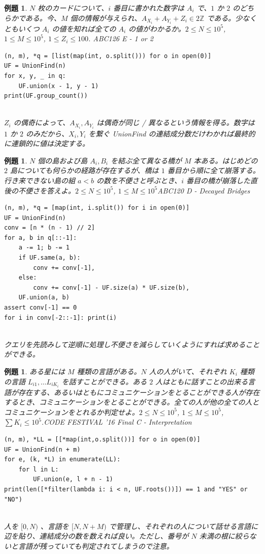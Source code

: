 \documentclass[12pt, a4j]{ltjsarticle}
\newtheorem{exm}[thm]{例題}
\newcommand*{\ZZ}{\mathbb{Z}}
\newcommand*{\SS}{\vspace{1cm}}
\begin{document}
\SS

\begin{exm} $N$ 枚のカードについて、$i$ 番目に書かれた数字は $A_i$ で、$1$ か $2$ のどちらかである。今、$M$ 個の情報が与えられ、$A_{X_i}+A_{Y_i}+Z_i \in 2\ZZ$ である。少なくともいくつ $A_i$ の値を知れば全ての $A_i$ の値がわかるか。$2\le N\le 10^5$, $1\le M\le 10^5$, $1\le Z_i\le 100$. \quad\upshape ABC126 E - 1 or 2
\begin{lstlisting}
(n, m), *q = [list(map(int, o.split())) for o in open(0)]
UF = UnionFind(n)
for x, y, _ in q:
    UF.union(x - 1, y - 1)
print(UF.group_count())
\end{lstlisting}\quad\\
$Z_i$ の偶奇によって、$A_{X_i},A_{Y_i}$ は偶奇が同じ / 異なるという情報を得る。数字は $1$ か $2$ のみだから、$X_i,Y_i$ を繋ぐ UnionFind の連結成分数だけわかれば最終的に連鎖的に値は決定する。
\end{exm}

\SS

\begin{exm} $N$ 個の島および島 $A_i,B_i$ を結ぶ全て異なる橋が $M$ 本ある。はじめどの $2$ 島についても何らかの経路が存在するが、橋は $1$ 番目から順に全て崩落する。行き来できない島の組 $a<b$ の数を不便さと呼ぶとき、$i$ 番目の橋が崩落した直後の不便さを答えよ。$2\le N\le 10^5$, $1\le M\le 10^5$\quad\upshape ABC120 D - Decayed Bridges\\
\begin{lstlisting}
(n, m), *q = [map(int, i.split()) for i in open(0)]
UF = UnionFind(n)
conv = [n * (n - 1) // 2]
for a, b in q[::-1]:
    a -= 1; b -= 1
    if UF.same(a, b):
        conv += conv[-1],
    else:
        conv += conv[-1] - UF.size(a) * UF.size(b),
    UF.union(a, b)
assert conv[-1] == 0
for i in conv[-2::-1]: print(i)
\end{lstlisting}\quad\\
クエリを先読みして逆順に処理し不便さを減らしていくようにすれば求めることができる。
\end{exm}

\newpage

\begin{exm} ある星には $M$ 種類の言語がある。$N$ 人の人がいて、それぞれ $K_i$ 種類の言語 $L_{i1},\ldots L_{iK_i}$ を話すことができる。ある $2$ 人はともに話すことの出来る言語が存在する、あるいはともにコミュニケーションをとることができる人が存在するとき、コミュニケーションをとることができる。全ての人が他の全ての人とコミュニケーションをとれるか判定せよ。$2\le N\le 10^5$, $1\le M\le 10^5$, $\sum K_i \le 10^5$.\quad\upshape CODE FESTIVAL '16 Final C - Interpretation\\
\begin{lstlisting}
(n, m), *LL = [[*map(int,o.split())] for o in open(0)]
UF = UnionFind(n + m)
for e, (k, *L) in enumerate(LL):
    for l in L:
        UF.union(e, l + n - 1)
print(len([*filter(lambda i: i < n, UF.roots())]) == 1 and "YES" or "NO")
\end{lstlisting}\quad\\
人を $[0,N)$ 、言語を $[N,N+M)$ で管理し、それぞれの人について話せる言語に辺を貼り、連結成分の数を数えれば良い。ただし、番号が $N$ 未満の根に絞らないと言語が残っていても判定されてしまうので注意。
\end{exm}
\end{document}
